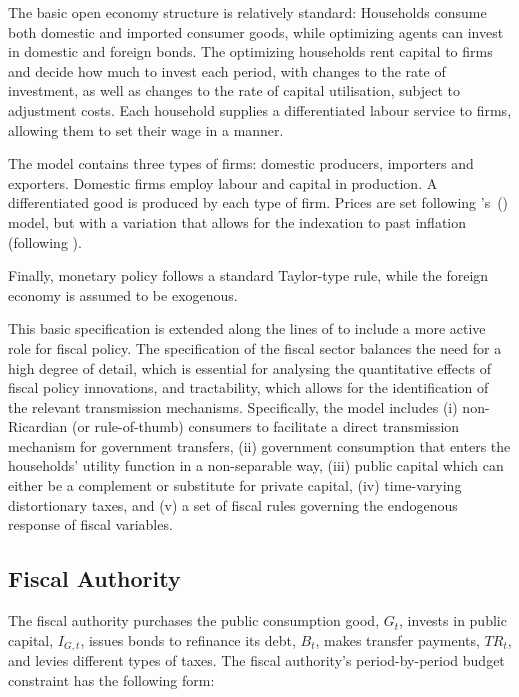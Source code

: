 \documentclass[a4paper,11pt]{article}
\numberwithin{equation}{section}
\newcommand\cites[1]{\citeauthor{#1}'s\ (\citeyear{#1})}
\begin{document}
	The basic open economy structure is relatively standard: Households consume both domestic and imported consumer goods, while optimizing agents can invest in domestic and foreign bonds. The optimizing households rent capital to firms and decide how much to invest each period, with changes to the rate of investment, as well as changes to the rate of capital utilisation, subject to adjustment costs. Each household supplies a differentiated labour service to firms, allowing them to set their wage in a \cite{calvo1983} manner. 
	
	The model contains three types of firms: domestic producers, importers and exporters. Domestic firms employ labour and capital in production. A differentiated good is produced by each type of firm. Prices are set following \cites{calvo1983} model, but with a variation that allows for the indexation to past inflation (following \cite{rabanal2006}).
	
	Finally, monetary policy follows a standard Taylor-type rule, while	the foreign economy is assumed to be exogenous.
	
	This basic specification is extended along the lines of \cite{coenen2013} to include a more active role for fiscal policy. The specification of the fiscal sector balances the need for a high degree of detail, which is essential for analysing the quantitative effects of fiscal policy innovations, and tractability, which allows for the identification of the relevant transmission mechanisms. Specifically, the model includes (i) non-Ricardian (or rule-of-thumb) consumers to facilitate a direct transmission mechanism for government transfers, (ii) government consumption that enters the households' utility function in a non-separable way, (iii) public capital which can either be a complement or substitute for private capital, (iv) time-varying distortionary taxes, and (v) a set of fiscal rules governing the endogenous response of fiscal variables.
	
	\subsection{Fiscal Authority} \label{fiscal}
	
	The fiscal authority purchases the public consumption good, $G_t$, invests in public capital, $I_{G,t}$, issues bonds to refinance its debt, $B_t$, makes transfer payments, $TR_t$, and levies different types of taxes. The fiscal authority's period-by-period budget constraint has the following form:
	
\end{document}
